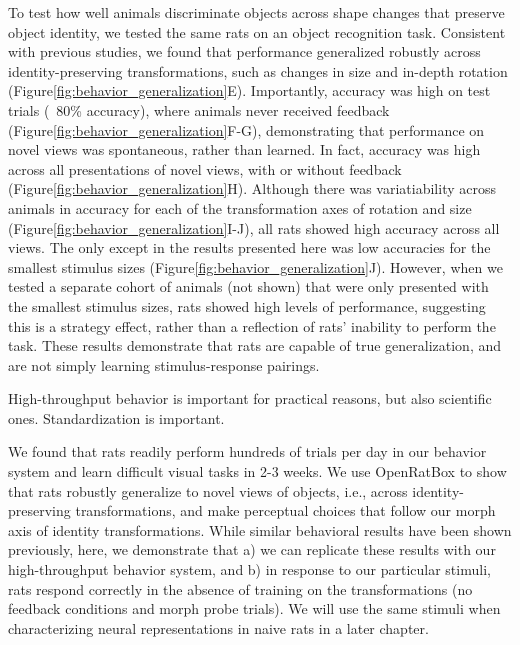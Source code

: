 To test how well animals discriminate objects across shape changes that preserve object identity, we tested the same rats on an object recognition task. Consistent with previous studies\cite{Zoccolan2009, Tafazoli2012Transformation-TolerantPriming, REFREF}, we found that performance generalized robustly across identity-preserving transformations, such as changes in size and in-depth rotation (Figure\ref{fig:behavior_generalization}E). Importantly, accuracy was high on test trials (~80\% accuracy), where animals never received feedback (Figure\ref{fig:behavior_generalization}F-G), demonstrating that performance on novel views was spontaneous, rather than learned. In fact, accuracy was high across all presentations of novel views, with or without feedback (Figure\ref{fig:behavior_generalization}H). Although there was variatiability across animals in accuracy for each of the transformation axes of rotation and size (Figure\ref{fig:behavior_generalization}I-J), all rats showed high accuracy across all views. The only except in the results presented here was low accuracies for the smallest stimulus sizes (Figure\ref{fig:behavior_generalization}J). However, when we tested a separate cohort of animals (not shown) that were only presented with the smallest stimulus sizes, rats showed high levels of performance, suggesting this is a strategy effect, rather than a reflection of rats' inability to perform the task\cite{Masis2020}. These results demonstrate that rats are capable of true generalization, and are not simply learning stimulus-response pairings. 

High-throughput behavior is important for practical reasons, but also scientific ones. 
Standardization is important. 

We found that rats readily perform hundreds of trials per day in our behavior system and learn difficult visual tasks in 2-3 weeks. We use OpenRatBox to show that rats robustly generalize to novel views of objects, i.e., across identity-preserving transformations, and make perceptual choices that follow our morph axis of identity transformations. While similar behavioral results have been shown previously\cite{Zoccolan2009, Tafazoli2012Transformation-TolerantPriming, Vermaercke2012}, here, we demonstrate that a) we can replicate these results with our high-throughput behavior system, and b) in response to our particular stimuli, rats respond correctly in the absence of training on the transformations (no feedback conditions and morph probe trials). We will use the same stimuli when characterizing neural representations in naive rats in a later chapter. 

